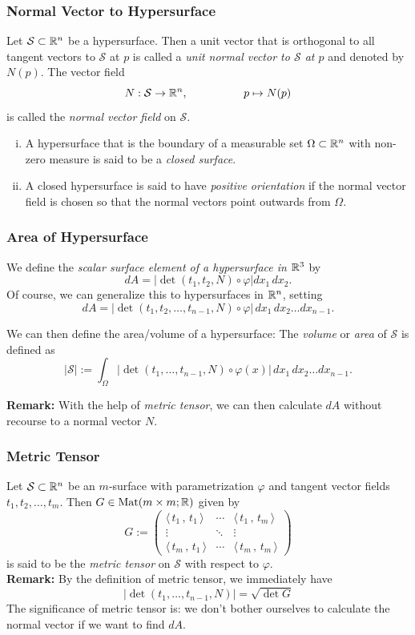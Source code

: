 \documentclass[10pt, t]{beamer}
\renewcommand{\emph}[1]{{\color{Turquoise3}\textsl{#1}}}
\newcommand{\myseries}[2]{$#1_1,#1_2,\dots,#1_#2$}
\newcommand{\nullspace}{~\\[15pt]}
\newcommand{\scp}[2]{\langle\,#1\,,\,#2\,\rangle} \newcommand{\scpp}{\langle\,\cdot\,,\,\cdot\,\rangle}
\begin{document}
\begin{frame}
    \frametitle{Normal Vector to Hypersurface}
    Let $\mathcal{S}\subset\mathbb{R}^n$ be a hypersurface. Then a unit vector that is orthogonal to all tangent vectors to $\mathcal{S}$ at $p$ is called a \emph{unit normal vector to $\mathcal{S}$ at $p$} and denoted by $N(p)$. The vector field
    \[N:\mathcal{S}\to\mathbb{R}^n,\qquad\qquad\quad
        p\mapsto N(p)\]
    is called the \emph{normal vector field} on $\mathcal{S}$.

    \begin{enumerate}[(i)]
        \item A hypersurface that is the boundary of a measurable set $\Omega\subset\mathbb{R}^n$ with non-zero measure is said to be a \emph{closed surface}.
        \item A closed hypersurface is said to have \emph{positive orientation} if the
              normal vector field is chosen so that the normal vectors point
              outwards from $\Omega$. 
    \end{enumerate}
\end{frame}

\begin{frame}
    \frametitle{Area of Hypersurface}

    We define the \emph{scalar surface element of a hypersurface in $\mathbb{R}^3$} by
    \[dA=|\det(t_1,t_2,N)\circ\varphi|dx_1\,dx_2.\]
    Of course, we can generalize this to hypersurfaces in $\mathbb{R}^n$, setting
    \[dA=|\det(t_1,t_2,\ldots,t_{n-1},N)\circ
        \varphi|\,dx_1\,dx_2\ldots dx_{n-1}.\]

    We can then define the area/volume of a hypersurface:
    The \emph{volume} or \emph{area} of $\mathcal{S}$ is defined as
    \[|\mathcal{S}|:=\int_\Omega|\det(t_1,\ldots,t_{n-1},N)
        \circ\varphi(x)|\,dx_1\,dx_2\ldots dx_{n-1}.\]

    \textbf{Remark:} With the help of \emph{metric tensor}, we can then calculate $dA$ without recourse to a normal vector $N$.
\end{frame}

\begin{frame}
    \frametitle{Metric Tensor}
    Let $\mathcal{S}\subset\mathbb{R}^n$ be an $m$-surface with parametrization $\varphi$ and tangent vector fields \myseries{t}{m}. Then $G\in\text{Mat}(m\times m;\mathbb{R})$ given by
    \[G:=\begin{pmatrix}
            \scp{t_1}{t_1} & \cdots & \scp{t_1}{t_m} \\
            \vdots         & \ddots & \vdots         \\
            \scp{t_m}{t_1} & \cdots & \scp{t_m}{t_m}
        \end{pmatrix}\]
    is said to be the \emph{metric tensor} on $\mathcal{S}$ with respect to $\varphi$.
    \nullspace
    \textbf{Remark:} By the definition of metric tensor, we immediately have
    $$\left|\operatorname{det}\left(t_{1}, \ldots, t_{n-1}, N\right)\right|=\sqrt{\operatorname{det} G}$$
    The significance of metric tensor is: we don't bother ourselves to calculate the normal vector if we want to find $dA$.

\end{frame}
\end{document}
